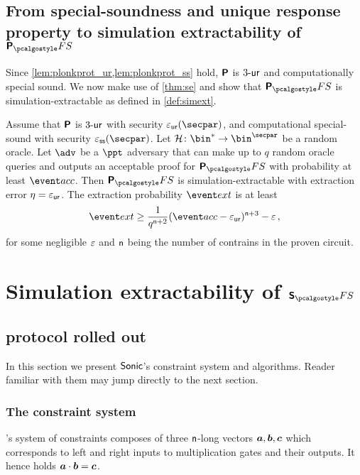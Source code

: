 \documentclass[runningheads,11pt]{llncs}
\theoremstyle{definition} \newtheorem{definition}[theorem]{Definition}
\begin{document}
\subsection{From special-soundness and unique response property to simulation
  extractability of $\plonkprotfs$}

Since \cref{lem:plonkprot_ur,lem:plonkprot_ss} hold, $\bm{\mathsf{P}}$ is ${3\text{-}\mathsf{ur}}$
and computationally special sound. We now 
make use of \cref{thm:se} and show that
$\plonkprot_\fs$ is simulation-extractable as defined in \cref{def:simext}.

\begin{corollary}
\label{thm:plonkprotfs_se}
Assume that $\bm{\mathsf{P}}$ is ${3\text{-}\mathsf{ur}}$ with security $\epsur(\secpar)$, and
computational special-sound with security $\epsss(\secpar)$. Let $\ro\colon
\bin^* \to \bin^\secpar$ be a random oracle. Let $\advse$ be a $\ppt$ adversary
that can make up to $q$ random oracle queries and outputs an acceptable proof
for $\plonkprotfs$ with probability at least $\accProb$. Then $\plonkprotfs$ is
simulation-extractable with extraction error $\eta = \varepsilon_{\mathsf{ur}}$. The extraction
probability $\extProb$ is at least
\[
	\extProb \geq \frac{1}{q^{\noofc + 2}} (\accProb - \epsur)^{\noofc + 3} -\eps\,,
\]
for some negligible $\varepsilon$ and $\mathsf{n}$ being the number of
contrains in the proven circuit.
\end{corollary}

\section{Simulation extractability of $\sonicprotfs$}
\label{sec:sonic}
\subsection{\sonic{} protocol rolled out}
In this section we present ${\textnormal{\textsf{Sonic}}}$'s constraint system and algorithms. Reader
familiar with them may jump directly to the next section.

\subsubsection{The constraint system}
\label{sec:sonic_constraint_system}
\sonic's system of constraints composes of three $\mathsf{n}$-long vectors
$\va, \vb, \vc$ which corresponds to left and right inputs to multiplication
gates and their outputs. It hence holds $\va \cdot \vb = \vc$.
\end{document}
